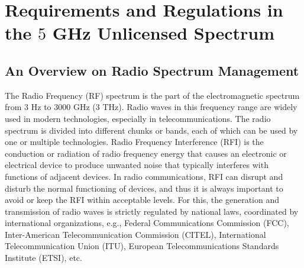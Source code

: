 %
%
%
\chapter{Requirements and Regulations in the $5$ GHz Unlicensed Spectrum}
\label{sec:LBT-overview} 



\section{An Overview on Radio Spectrum Management}

The Radio Frequency (RF) spectrum is the part of the electromagnetic spectrum from $3$ Hz to $3000$ GHz ($3$ THz). Radio waves in this frequency range are widely used in modern technologies, especially in telecommunications. The radio spectrum is divided into different chunks or bands, each of which can be used by one or multiple technologies. Radio Frequency Interference (RFI) is the conduction or radiation of radio frequency energy that causes an electronic or electrical device to produce unwanted noise that typically interferes with functions of adjacent devices. In radio communications, RFI can disrupt and disturb the normal functioning of devices, and thus it is always important to avoid or keep the RFI within acceptable levels. For this, the generation and transmission of radio waves is strictly regulated by national laws, coordinated by international organizations, e.g., Federal Communications Commission (FCC), Inter-American Telecommunication Commission (CITEL), International Telecommunication Union (ITU), European Telecommunications Standards Institute (ETSI), etc. 

